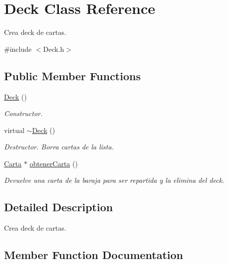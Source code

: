 \hypertarget{class_deck}{}\section{Deck Class Reference}
\label{class_deck}


Crea deck de cartas.  




{\ttfamily \#include $<$Deck.\+h$>$}

\subsection*{Public Member Functions}
\begin{DoxyCompactItemize}
\item 
\hyperlink{class_deck_a57ae1cb4ac6fd61c249cefb2db85eb99}{Deck} ()\hypertarget{class_deck_a57ae1cb4ac6fd61c249cefb2db85eb99}{}\label{class_deck_a57ae1cb4ac6fd61c249cefb2db85eb99}

\begin{DoxyCompactList}\small\item\em Constructor. \end{DoxyCompactList}\item 
virtual \hyperlink{class_deck_a7d1331cc558c302fdf44e5ae8aae1a95}{$\sim$\+Deck} ()\hypertarget{class_deck_a7d1331cc558c302fdf44e5ae8aae1a95}{}\label{class_deck_a7d1331cc558c302fdf44e5ae8aae1a95}

\begin{DoxyCompactList}\small\item\em Destructor. Borra cartas de la lista. \end{DoxyCompactList}\item 
\hyperlink{class_carta}{Carta} $\ast$ \hyperlink{class_deck_a1f65a1dde03b592f8e74700635f31af7}{obtener\+Carta} ()
\begin{DoxyCompactList}\small\item\em Devuelve una carta de la baraja para ser repartida y la elimina del deck. \end{DoxyCompactList}\end{DoxyCompactItemize}


\subsection{Detailed Description}
Crea deck de cartas. 

\subsection{Member Function Documentation}
